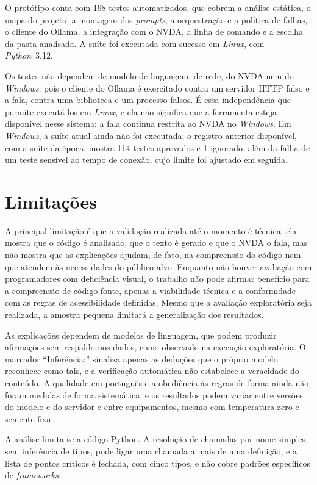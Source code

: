 \documentclass[
    12pt,                   %
    openright,              %
    oneside,                %
    a4paper,                %
    sumario=tradicional,    %
    english,                %
    brazil,                 %
    ]{abntex2}
\begin{document}
O protótipo conta com 198 testes automatizados, que cobrem a análise estática, o mapa do projeto, a montagem dos \textit{prompts}, a orquestração e a política de falhas, o cliente do Ollama, a integração com o NVDA, a linha de comando e a escolha da pasta analisada. A suíte foi executada com sucesso em \textit{Linux}, com \textit{Python}~3.12.

Os testes não dependem de modelo de linguagem, de rede, do NVDA nem do \textit{Windows}, pois o cliente do Ollama é exercitado contra um servidor HTTP falso e a fala, contra uma biblioteca e um processo falsos. É essa independência que permite executá-los em \textit{Linux}, e ela não significa que a ferramenta esteja disponível nesse sistema: a fala continua restrita ao NVDA no \textit{Windows}. Em \textit{Windows}, a suíte atual ainda não foi executada; o registro anterior disponível, com a suíte da época, mostra 114 testes aprovados e 1 ignorado, além da falha de um teste sensível ao tempo de conexão, cujo limite foi ajustado em seguida.

\section{Limitações}\label{sec:limitacoes}

A principal limitação é que a validação realizada até o momento é técnica: ela mostra que o código é analisado, que o texto é gerado e que o NVDA o fala, mas não mostra que as explicações ajudam, de fato, na compreensão do código nem que atendem às necessidades do público-alvo. Enquanto não houver avaliação com programadores com deficiência visual, o trabalho não pode afirmar benefício para a compreensão de código-fonte, apenas a viabilidade técnica e a conformidade com as regras de acessibilidade definidas. Mesmo que a avaliação exploratória seja realizada, a amostra pequena limitará a generalização dos resultados.

As explicações dependem de modelos de linguagem, que podem produzir afirmações sem respaldo nos dados, como observado na execução exploratória. O marcador \enquote{Inferência:} sinaliza apenas as deduções que o próprio modelo reconhece como tais, e a verificação automática não estabelece a veracidade do conteúdo. A qualidade em português e a obediência às regras de forma ainda não foram medidas de forma sistemática, e os resultados podem variar entre versões do modelo e do servidor e entre equipamentos, mesmo com temperatura zero e semente fixa.

A análise limita-se a código Python. A resolução de chamadas por nome simples, sem inferência de tipos, pode ligar uma chamada a mais de uma definição, e a lista de pontos críticos é fechada, com cinco tipos, e não cobre padrões específicos de \textit{frameworks}.
\end{document}
